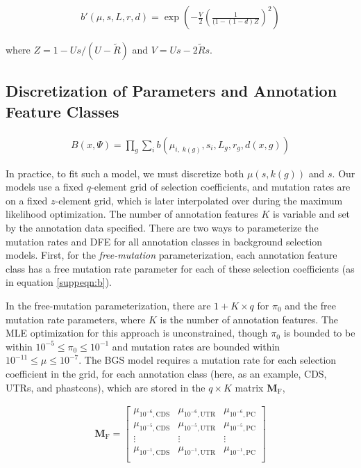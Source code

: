 \documentclass[11pt]{article}
\begin{document}
\begin{align}
  b'(\mu, s, L, r, d) = \exp\left( -\frac{V}{2} \left(\frac{1}{(1-(1-d)Z}\right)^2 \right) 
\end{align}

where $Z = 1 - Us / (U-\widetilde{R})$ and $V = Us - 2\widetilde{R}s$.


\subsection{Discretization of Parameters and Annotation Feature Classes}

\begin{align}
  \label{suppeqn:b}
  B(x, \Psi) = \prod_g \sum_{i} b(\mu_{i, \;k(g)}, s_i, L_g, r_g, d(x, g))
\end{align}

In practice, to fit such a model, we must discretize both $\mu(s, k(g))$ and
$s$. Our models use a fixed $q$-element grid of selection coefficients, and
mutation rates are on a fixed $z$-element grid, which is later interpolated
over during the maximum likelihood optimization. The number of annotation
features $K$ is variable and set by the annotation data specified. There are
two ways to parameterize the mutation rates and DFE for all annotation classes
in background selection models. First, for the \emph{free-mutation}
parameterization, each annotation feature class has a free mutation rate
parameter for each of these selection coefficients (as in equation
\eqref{suppeqn:b}).

In the free-mutation parameterization, there are $1 + K \times q$ for $\pi_0$
and the free mutation rate parameters, where $K$ is the number of annotation
features. The MLE optimization for this approach is unconstrained, though
$\pi_0$ is bounded to be within $10^{-5} \le \pi_0 \le 10^{-1}$ and mutation
rates are bounded within $10^{-11} \le \mu \le 10^{-7}$. The BGS model requires
a mutation rate for each selection coefficient in the grid, for each annotation
class (here, as an example, CDS, UTRs, and phastcons), which are stored in the
$q \times K$ matrix $\mathbf{M}_\text{F}$,

\begin{align}
  \mathbf{M}_\text{F} = \begin{bmatrix}
    \mu_{10^{-6},\text{CDS}} & \mu_{10^{-6},\text{UTR}} & \mu_{10^{-6},\text{PC}} \\
    \mu_{10^{-5},\text{CDS}} & \mu_{10^{-5},\text{UTR}} & \mu_{10^{-5},\text{PC}} \\
    \vdots & \vdots & \vdots \\
    \mu_{10^{-1},\text{CDS}} & \mu_{10^{-1},\text{UTR}} & \mu_{10^{-1},\text{PC}} \\
  \end{bmatrix}
\end{align}
\end{document}

